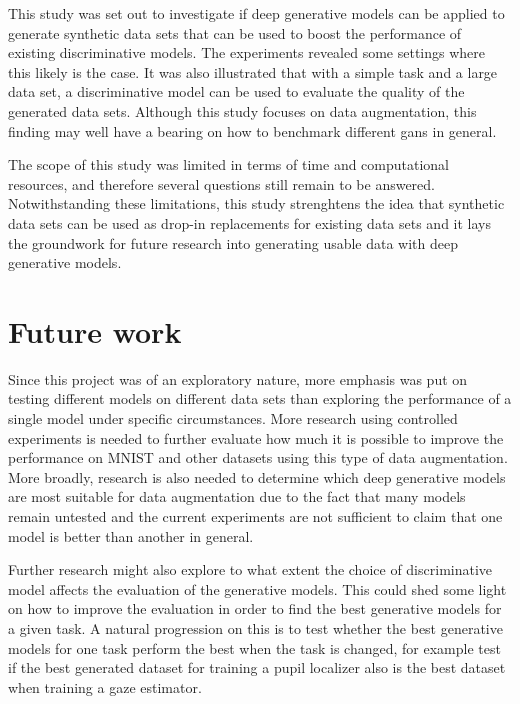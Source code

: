 This study was set out to investigate if deep generative models can be applied to generate synthetic data sets that can be used to boost the performance of existing discriminative models. The experiments revealed some settings where this likely is the case. It was also illustrated that with a simple task and a large data set, a discriminative model can be used to evaluate the quality of the generated data sets. Although this study focuses on data augmentation, this finding may well have a bearing on how to benchmark different \acrshort{gans} in general. 

The scope of this study was limited in terms of time and computational resources, and therefore several questions still remain to be answered. Notwithstanding these limitations, this study strenghtens the idea that synthetic data sets can be used as drop-in replacements for existing data sets and it lays the groundwork for future research into generating usable data with deep generative models.

\section{Future work}
Since this project was of an exploratory nature, more emphasis was put on testing different models on different data sets than exploring the performance of a single model under specific circumstances. More research using controlled experiments is needed to further evaluate how much it is possible to improve the performance on MNIST and other datasets using this type of data augmentation. More broadly, research is also needed to determine which deep generative models are most suitable for data augmentation due to the fact that many models remain untested and the current experiments are not sufficient to claim that one model is better than another in general.

Further research might also explore to what extent the choice of discriminative model affects the evaluation of the generative models. This could shed some light on how to improve the evaluation in order to find the best generative models for a given task. A natural progression on this is to test whether the best generative models for one task perform the best when the task is changed, for example test if the best generated dataset for training a pupil localizer also is the best dataset when training a gaze estimator.



